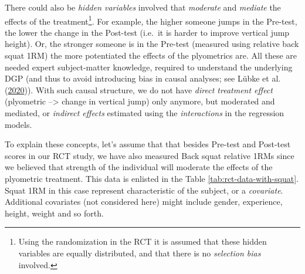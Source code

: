 \documentclass[
]{book}
\begin{document}
There could also be \emph{hidden variables} involved that \emph{moderate} and \emph{mediate} the effects of the treatment\footnote{Using the randomization in the RCT it is assumed that these hidden variables are equally distributed, and that there is no \emph{selection bias} involved.}. For example, the higher someone jumps in the Pre-test, the lower the change in the Post-test (i.e.~it is harder to improve vertical jump height). Or, the stronger someone is in the Pre-test (measured using relative back squat 1RM) the more potentiated the effects of the plyometrics are. All these are needed expert subject-matter knowledge, required to understand the underlying DGP (and thus to avoid introducing bias in causal analyses; see Lübke et al. (\protect\hyperlink{ref-lubkeWhyWeShould2020}{2020})). With such causal structure, we do not have \emph{direct treatment effect} (plyometric --\textgreater{} change in vertical jump) only anymore, but moderated and mediated, or \emph{indirect effects} estimated using the \emph{interactions} in the regression models.

To explain these concepts, let's assume that that besides Pre-test and Post-test scores in our RCT study, we have also measured Back squat relative 1RMs since we believed that strength of the individual will moderate the effects of the plyometric treatment. This data is enlisted in the Table \ref{tab:rct-data-with-squat}. Squat 1RM in this case represent characteristic of the subject, or a \emph{covariate}. Additional covariates (not considered here) might include gender, experience, height, weight and so forth.
\end{document}
